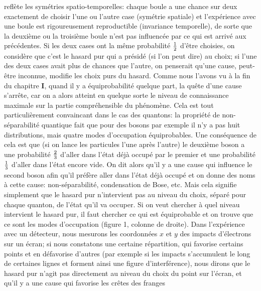 refl\`ete les sym\'etries spatio-temporelles: chaque boule a une chance 
sur deux exactement de choisir l'une ou l'autre case (sym\'etrie spatiale)
et l'exp\'erience avec une boule est rigoureusement reproductible
(invariance temporelle), de sorte que la deuxi\`eme ou la troisi\`eme
boule n'est pas influenc\'ee par ce qui est arriv\'e aux pr\'ec\'edentes. Si
les deux cases ont la m\^eme probabilit\'e $1 \over 2$ d'\^etre choisies,
on consid\`ere que c'est le hasard pur qui a pr\'esid\'e (si l'on peut dire)
au choix; si l'une des deux cases avait plus de chances que l'autre, on
penserait qu'une cause, peut-\^etre inconnue, modifie les choix purs du
hasard. Comme nous l'avons vu \`a la fin du chapitre {\bf I}, quand il y a
\'equiprobabilit\'e quelque  part, la qu\^ete d'une cause s'arr\^ete, car on
a alors atteint en quelque sorte le niveau de connaissance maximale sur 
la partie compr\'ehensible du ph\'enom\`ene. Cela est tout
particuli\`erement convaincant dans le cas des quantons: la propri\'et\'e
de non-s\'eparabilit\'e quantique fait que pour des bosons par exemple il
n'y a pas huit distributions,  mais quatre modes d'occupation
\'equiprobables. Une cons\'equence de cela est que (si on lance les
particules l'une apr\`es l'autre) le deuxi\`eme boson a une probabilit\'e
$2 \over 3$ d'aller dans l'\'etat d\'ej\`a occup\'e par le premier et  une
probabilit\'e $1 \over 3$ d'aller dans l'\'etat encore vide. On dit alors
qu'il y a une cause qui influence le second boson afin qu'il pr\'ef\`ere
aller dans l'\'etat d\'ej\`a occup\'e et on donne des noms \`a cette cause:
non-s\'eparabilit\'e, condensation de Bose, etc. Mais cela signifie
simplement que le hasard pur n'intervient pas au niveau du choix,
s\'epar\'e pour chaque quanton, de l'\'etat qu'il va occuper. Si on veut
chercher \`a quel niveau intervient le hasard pur, il faut chercher ce qui
est \'equiprobable et on trouve que ce sont les modes d'occupation (figure
1, colonne de droite). 
\medskip  
Dans l'exp\'erience avec un d\'etecteur, nous mesurons les coordonn\'ees
$x$ et $y$ des impacts d'\'electrons sur un \'ecran; si nous constatons 
une certaine r\'epartition, qui favorise certains points et en d\'efavorise
d'autres (par exemple si les impacts s'accumulent le long de certaines
lignes et forment ainsi une figure d'interf\'erence), nous dirons que le
hasard pur n'agit pas directement au niveau du choix du point sur
l'\'ecran, et qu'il y a une cause qui favorise les cr\^etes des franges

